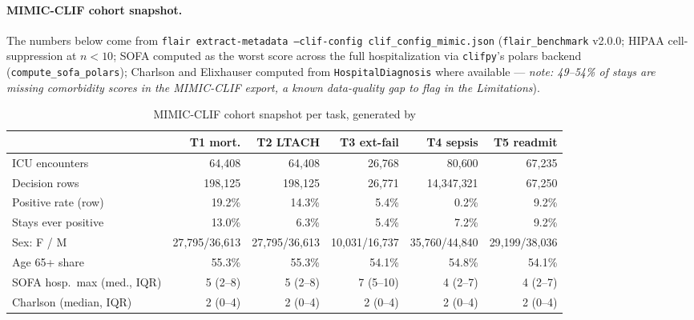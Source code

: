 \documentclass[11pt]{article}
\begin{document}
\paragraph{MIMIC-CLIF cohort snapshot.} The numbers below come from
\texttt{flair extract-metadata --clif-config clif\_config\_mimic.json}
(\texttt{flair\_benchmark} v2.0.0; HIPAA cell-suppression at $n{<}10$;
SOFA computed as the worst score across the full hospitalization via
\texttt{clifpy}'s polars backend (\texttt{compute\_sofa\_polars});
Charlson and Elixhauser computed from \texttt{HospitalDiagnosis} where
available --- \emph{note: 49--54\% of stays are missing comorbidity
scores in the MIMIC-CLIF export, a known data-quality gap to flag in
the Limitations}).

\begin{table}[h]
\centering
\footnotesize
\setlength{\tabcolsep}{3pt}
\begin{tabular}{lrrrrr}
\toprule
                             & \textbf{T1 mort.} & \textbf{T2 LTACH} & \textbf{T3 ext-fail} & \textbf{T4 sepsis} & \textbf{T5 readmit} \\
\midrule
ICU encounters               & 64{,}408          & 64{,}408          & 26{,}768           & 80{,}600         & 67{,}235        \\
Decision rows                & 198{,}125         & 198{,}125         & 26{,}771           & 14{,}347{,}321  & 67{,}250        \\
Positive rate (row)          & 19.2\%            & 14.3\%            & 5.4\%              & 0.2\%            & 9.2\%           \\
Stays ever positive          & 13.0\%            & 6.3\%             & 5.4\%              & 7.2\%            & 9.2\%           \\
\midrule
Sex: F / M                   & 27{,}795/36{,}613 & 27{,}795/36{,}613 & 10{,}031/16{,}737  & 35{,}760/44{,}840 & 29{,}199/38{,}036 \\
Age 65+ share                & 55.3\%            & 55.3\%            & 54.1\%             & 54.8\%           & 54.1\%          \\
SOFA hosp.\ max (med., IQR)  & 5 (2--8)          & 5 (2--8)          & 7 (5--10)          & 4 (2--7)         & 4 (2--7)        \\
Charlson (median, IQR)       & 2 (0--4)          & 2 (0--4)          & 2 (0--4)           & 2 (0--4)         & 2 (0--4)        \\
\bottomrule
\end{tabular}
\caption{MIMIC-CLIF cohort snapshot per task, generated by
}
\end{table}
\end{document}
